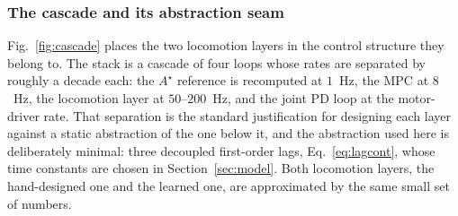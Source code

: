 \documentclass[11pt,a4paper]{article}
\newcommand{\astar}{$A^\star$}
\begin{document}

\subsubsection{The cascade and its abstraction seam}
\label{sec:cascade}

Fig.~\ref{fig:cascade} places the two locomotion layers in the control structure they belong to. The stack is
a cascade of four loops whose rates are separated by roughly a decade each: the \astar{} reference is
recomputed at $1$~Hz, the MPC at $8$~Hz, the locomotion layer at $50$--$200$~Hz, and the joint PD loop at the
motor-driver rate. That separation is the standard justification for designing each layer against a static
abstraction of the one below it, and the abstraction used here is deliberately minimal: three decoupled
first-order lags, Eq.~\eqref{eq:lagcont}, whose time constants are chosen in Section~\ref{sec:model}. Both
locomotion layers, the hand-designed one and the learned one, are approximated by the same small set of numbers.

\end{document}
